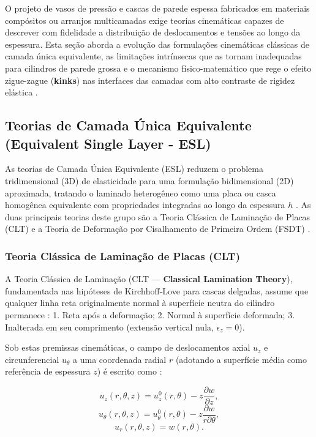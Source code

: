 O projeto de vasos de pressão e cascas de parede espessa fabricados em materiais compósitos ou arranjos multicamadas exige teorias cinemáticas capazes de descrever com fidelidade a distribuição de deslocamentos e tensões ao longo da espessura. Esta seção aborda a evolução das formulações cinemáticas clássicas de camada única equivalente, as limitações intrínsecas que as tornam inadequadas para cilindros de parede grossa e o mecanismo físico-matemático que rege o efeito zigue-zague (\textbf{kinks}) nas interfaces das camadas com alto contraste de rigidez elástica \cite{RMJones2018}.

\subsection{Teorias de Camada Única Equivalente (Equivalent Single Layer - ESL)}

As teorias de Camada Única Equivalente (ESL) reduzem o problema tridimensional (3D) de elasticidade para uma formulação bidimensional (2D) aproximada, tratando o laminado heterogêneo como uma placa ou casca homogênea equivalente com propriedades integradas ao longo da espessura $h$ \cite{RMJones2018}. As duas principais teorias deste grupo são a Teoria Clássica de Laminação de Placas (CLT) e a Teoria de Deformação por Cisalhamento de Primeira Ordem (FSDT) \cite{RMJones2018}.

\subsubsection{Teoria Clássica de Laminação de Placas (CLT)}

A Teoria Clássica de Laminação (CLT — \textbf{Classical Lamination Theory}), fundamentada nas hipóteses de Kirchhoff-Love para cascas delgadas, assume que qualquer linha reta originalmente normal à superfície neutra do cilindro permanece \cite{RMJones2018}:
1. Reta após a deformação;
2. Normal à superfície deformada;
3. Inalterada em seu comprimento (extensão vertical nula, $\epsilon_z = 0$).

Sob estas premissas cinemáticas, o campo de deslocamentos axial $u_z$ e circunferencial $u_\theta$ a uma coordenada radial $r$ (adotando a superfície média como referência de espessura $z$) é escrito como \cite{RMJones2018}:

\begin{equation}
    u_z(r, \theta, z) = u_z^0(r, \theta) - z \frac{\partial w}{\partial z},
\end{equation}\label{eq:clt_disp1}
\begin{equation}
     u_\theta(r, \theta, z) = u_\theta^0(r, \theta) - z \frac{\partial w}{r \partial \theta},
\end{equation} \label{eq:clt_disp2}
\begin{equation}
    u_r(r, \theta, z) = w(r, \theta).
\end{equation}\label{eq:clt_disp3}

